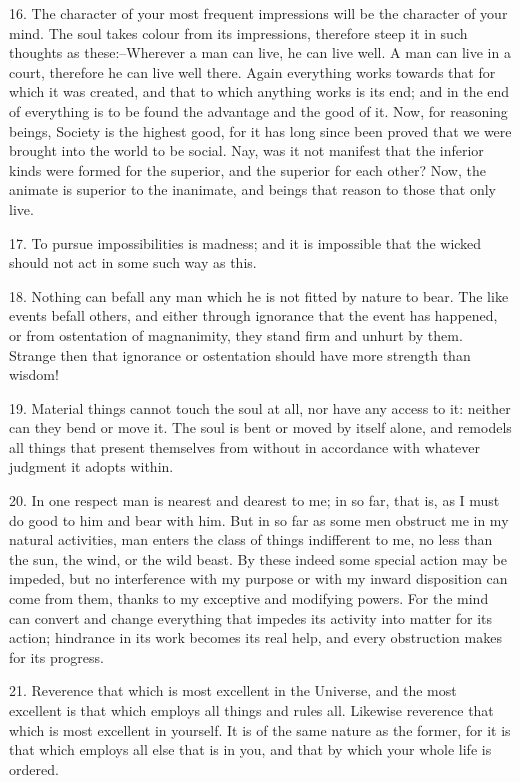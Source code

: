 \documentclass{book}
\begin{document}
16. The character of your most frequent impressions will be the
character of your mind. The soul takes colour from its impressions,
therefore steep it in such thoughts as these:--Wherever a man can
live, he can live well. A man can live in a court, therefore he can
live well there. Again everything works towards that for which it was
created, and that to which anything works is its end; and in the end
of everything is to be found the advantage and the good of it. Now,
for reasoning beings, Society is the highest good, for it has long
since been proved that we were brought into the world to be
social. Nay, was it not manifest that the inferior kinds were formed
for the superior, and the superior for each other? Now, the animate is
superior to the inanimate, and beings that reason to those that only
live.

\newpage

17. To pursue impossibilities is madness; and it is impossible that
the wicked should not act in some such way as this.

18. Nothing can befall any man which he is not fitted by nature to
bear. The like events befall others, and either through ignorance that
the event has happened, or from ostentation of magnanimity, they stand
firm and unhurt by them. Strange then that ignorance or ostentation
should have more strength than wisdom!

19. Material things cannot touch the soul at all, nor have any access
to it: neither can they bend or move it. The soul is bent or moved by
itself alone, and remodels all things that present themselves from
without in accordance with whatever judgment it adopts within.

20. In one respect man is nearest and dearest to me; in so far, that
is, as I must do good to him and bear with him. But in so far as some
men obstruct me in my natural activities, man enters the class of
things indifferent to me, no less than the sun, the wind, or the wild
beast. By these indeed some special action may be impeded, but no
interference with my purpose or with my inward disposition can come
from them, thanks to my exceptive and modifying powers. For the mind
can convert and change everything that impedes its activity into
matter for its action; hindrance in its work becomes its real help,
and every obstruction makes for its progress.

21. Reverence that which is most excellent in the Universe, and the
most excellent is that which employs all things and rules
all. Likewise reverence that which is most excellent in yourself. It
is of the same nature as the former, for it is that which employs all
else that is in you, and that by which your whole life is ordered.
\end{document}
